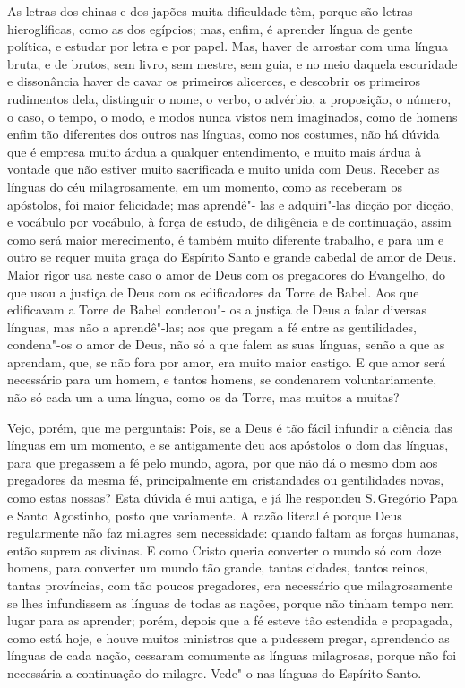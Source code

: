 As letras dos chinas e dos japões muita dificuldade têm, porque são
letras hieroglíficas, como as dos egípcios; mas, enfim, é aprender
língua de gente política, e estudar por letra e por papel. Mas, haver de
arrostar com uma língua bruta, e de brutos, sem livro, sem mestre, sem
guia, e no meio daquela escuridade e dissonância haver de cavar os
primeiros alicerces, e descobrir os primeiros rudimentos dela,
distinguir o nome, o verbo, o advérbio, a proposição, o número, o caso,
o tempo, o modo, e modos nunca vistos nem imaginados, como de homens
enfim tão diferentes dos outros nas línguas, como nos costumes, não há
dúvida que é empresa muito árdua a qualquer entendimento, e muito mais
árdua à vontade que não estiver muito sacrificada e muito unida com
Deus. Receber as línguas do céu milagrosamente, em um momento, como as
receberam os apóstolos, foi maior felicidade; mas aprendê"- las e
adquiri"-las dicção por dicção, e vocábulo por vocábulo, à força de
estudo, de diligência e de continuação, assim como será maior
merecimento, é também muito diferente trabalho, e para um e outro se
requer muita graça do Espírito Santo e grande cabedal de amor de Deus.
Maior rigor usa neste caso o amor de Deus com os pregadores do
Evangelho, do que usou a justiça de Deus com os edificadores da Torre de
Babel. Aos que edificavam a Torre de Babel condenou"- os a justiça de
Deus a falar diversas línguas, mas não a aprendê"-las; aos que pregam a
fé entre as gentilidades, condena"-os o amor de Deus, não só a que falem
as suas línguas, senão a que as aprendam, que, se não fora por amor, era
muito maior castigo. E que amor será necessário para um homem, e tantos
homens, se condenarem voluntariamente, não só cada um a uma língua,
como os da Torre, mas muitos a muitas?

Vejo, porém, que me perguntais: Pois, se a Deus é tão fácil infundir a
ciência das línguas em um momento, e se antigamente deu aos apóstolos o
dom das línguas, para que pregassem a fé pelo mundo, agora, por que não
dá o mesmo dom aos pregadores da mesma fé, principalmente em
cristandades ou gentilidades novas, como estas nossas? Esta dúvida é mui
antiga, e já lhe respondeu S.\,Gregório Papa e Santo Agostinho, posto que
variamente. A razão literal é porque Deus regularmente não faz milagres
sem necessidade: quando faltam as forças humanas, então suprem as
divinas. E como Cristo queria converter o mundo só com doze homens, para
converter um mundo tão grande, tantas cidades, tantos reinos, tantas
províncias, com tão poucos pregadores, era necessário que milagrosamente
se lhes infundissem as línguas de todas as nações, porque não tinham
tempo nem lugar para as aprender; porém, depois que a fé esteve tão
estendida e propagada, como está hoje, e houve muitos ministros que a
pudessem pregar, aprendendo as línguas de cada nação, cessaram comumente
as línguas milagrosas, porque não foi necessária a continuação do
milagre. Vede"-o nas línguas do Espírito Santo.

